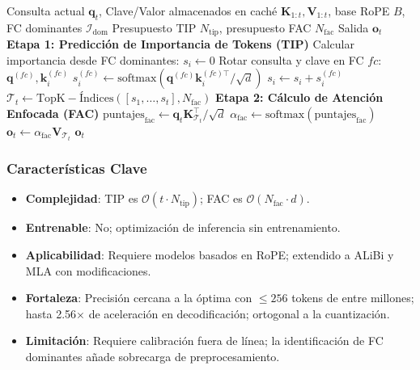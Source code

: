 \begin{algorithm}[H]
\caption{FASA: Atención Dispersa Consciente de la Frecuencia (en Tiempo de Inferencia)}
\begin{algorithmic}[1]
\Require Consulta actual $\mathbf{q}_t$, Clave/Valor almacenados en caché $\mathbf{K}_{1:t}, \mathbf{V}_{1:t}$, base RoPE $B$, FC dominantes $\mathcal{I}_{\text{dom}}$
\Require Presupuesto TIP $N_{\text{tip}}$, presupuesto FAC $N_{\text{fac}}$
\Ensure Salida $\mathbf{o}_t$
\State \textbf{Etapa 1: Predicción de Importancia de Tokens (TIP)}
        \State Calcular importancia desde FC dominantes: $s_i \gets 0$
            \State Rotar consulta y clave en FC $fc$: $\mathbf{q}^{(fc)}, \mathbf{k}_i^{(fc)}$
            \State $s_i^{(fc)} \gets \text{softmax}(\mathbf{q}^{(fc)} \mathbf{k}_i^{(fc)\top} / \sqrt{d}) $
            \State $s_i \gets s_i + s_i^{(fc)}$
        \EndFor
    \EndFor
    \State $\mathcal{T}_t \gets \mathrm{TopK-Índices}([s_1, \ldots, s_t], N_{\text{fac}})$ 
\EndFor
\State \textbf{Etapa 2: Cálculo de Atención Enfocada (FAC)}
\State $\text{puntajes}_{\text{fac}} \gets \mathbf{q}_t \mathbf{K}_{\mathcal{T}_t}^\top / \sqrt{d}$ 
\State $\alpha_{\text{fac}} \gets \text{softmax}(\text{puntajes}_{\text{fac}})$ 
\State $\mathbf{o}_t \gets \alpha_{\text{fac}} \mathbf{V}_{\mathcal{T}_t}$ 
\Return $\mathbf{o}_t$
\end{algorithmic}
\end{algorithm}

\subsubsection{Características Clave}

\begin{itemize}[leftmargin=*]
    \item \textbf{Complejidad}: TIP es $\mathcal{O}(t \cdot N_{\text{tip}})$; FAC es $\mathcal{O}(N_{\text{fac}} \cdot d)$.
    \item \textbf{Entrenable}: No; optimización de inferencia sin entrenamiento.
    \item \textbf{Aplicabilidad}: Requiere modelos basados en RoPE; extendido a ALiBi y MLA con modificaciones.
    \item \textbf{Fortaleza}: Precisión cercana a la óptima con $\leq 256$ tokens de entre millones; hasta 2.56$\times$ de aceleración en decodificación; ortogonal a la cuantización.
    \item \textbf{Limitación}: Requiere calibración fuera de línea; la identificación de FC dominantes añade sobrecarga de preprocesamiento.
\end{itemize}

